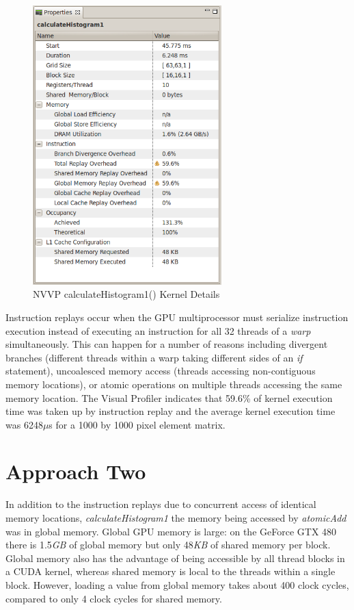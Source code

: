 \documentclass{article}
\begin{document}
\begin{figure}
\centering
\includegraphics[width=0.65\textwidth]{screenshots/nvvp/calculateHistogram1_screen3.png}
\caption{NVVP calculateHistogram1() Kernel Details}
\label{kernel1nvvp3}
\end{figure}


Instruction replays occur when the GPU multiprocessor must serialize instruction execution instead of executing an instruction for all 32 threads of a \emph{warp} simultaneously. This can happen for a number of reasons including divergent branches (different threads within a warp taking different sides of an \emph{if} statement), uncoalesced memory access (threads accessing non-contiguous memory locations), or atomic operations on multiple threads accessing the same memory location. The Visual Profiler indicates that 59.6\% of kernel execution time was taken up by instruction replay and the average kernel execution time was 6248$\mu$s for a 1000 by 1000 pixel element matrix.

\section{Approach Two}\label{approach2}

In addition to the instruction replays due to concurrent access of identical memory locations, \emph{calculateHistogram1} the memory being accessed by \emph{atomicAdd} was in global memory. Global GPU memory is large: on the GeForce GTX 480 there is 1.5\emph{GB} of global memory but only 48\emph{KB} of shared memory per block\cite{geforce480}. Global memory also has the advantage of being accessible by all thread blocks in a CUDA kernel, whereas shared memory is local to the threads within a single block. However, loading a value from global memory takes about 400 clock cycles, compared to only 4 clock cycles for shared memory\cite{shared-memory}.
\end{document}
